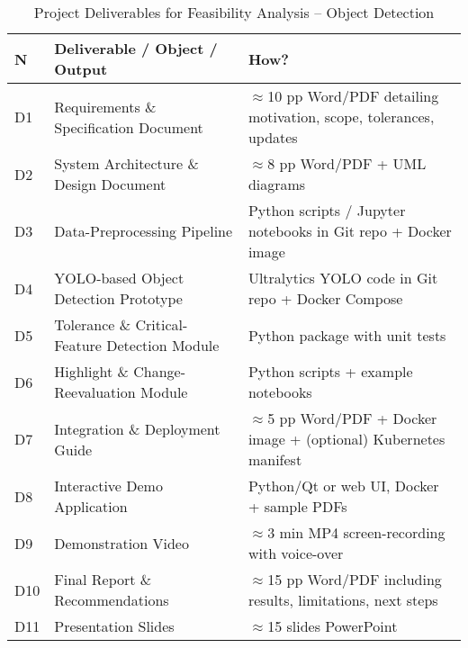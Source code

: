 \documentclass{article}
\begin{document}
\begin{table}[ht]
    \centering
    \caption{Project Deliverables for Feasibility Analysis – Object Detection}
    \begin{tabular}{p{1cm} p{7cm} p{6cm}}
    \toprule
    \textbf{N} & \textbf{Deliverable / Object / Output} & \textbf{How?} \\
    \midrule
    D1 & Requirements \& Specification Document
       & $\approx$10 pp Word/PDF detailing motivation, scope, tolerances, updates \\[4pt]
    D2 & System Architecture \& Design Document
       & $\approx$8 pp Word/PDF + UML diagrams \\[4pt]
    D3 & Data-Preprocessing Pipeline
       & Python scripts / Jupyter notebooks in Git repo + Docker image \\[4pt]
    D4 & YOLO-based Object Detection Prototype
       & Ultralytics YOLO code in Git repo + Docker Compose \\[4pt]
    D5 & Tolerance \& Critical-Feature Detection Module
       & Python package with unit tests \\[4pt]
    D6 & Highlight \& Change-Reevaluation Module
       & Python scripts + example notebooks \\[4pt]
    D7 & Integration \& Deployment Guide
       & $\approx$5 pp Word/PDF + Docker image + (optional) Kubernetes manifest \\[4pt]
    D8 & Interactive Demo Application
       & Python/Qt or web UI, Docker + sample PDFs \\[4pt]
    D9 & Demonstration Video
       & $\approx$3 min MP4 screen-recording with voice-over \\[4pt]
    D10 & Final Report \& Recommendations
        & $\approx$15 pp Word/PDF including results, limitations, next steps \\[4pt]
    D11 & Presentation Slides
        & $\approx$15 slides PowerPoint \\
    \bottomrule
    \end{tabular}
\end{table}
\end{document}
